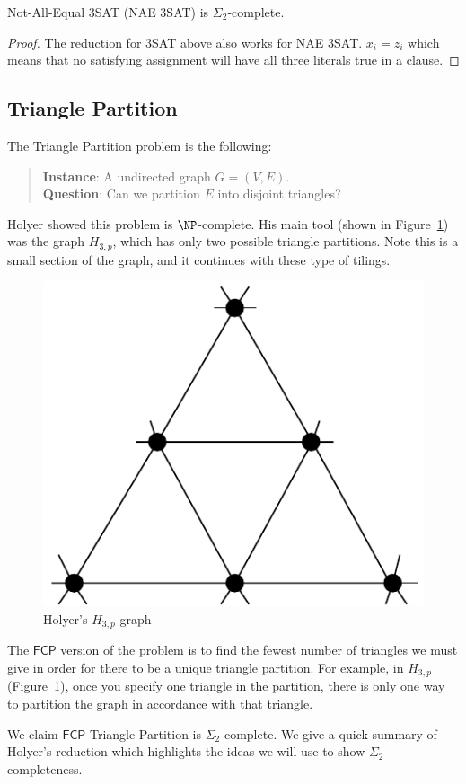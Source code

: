 \documentclass[runningheads,a4paper]{llncs}
\begin{document}
\begin{corollary}
Not-All-Equal 3SAT (NAE 3SAT) is $\Sigma_2$-complete.
\end{corollary}

\begin{proof}
The reduction for 3SAT above also works for NAE 3SAT. $x_i = \overline{z_i}$ which means that no satisfying assignment will have all three literals true in a clause. 
\end{proof}

\subsection{Triangle Partition}

The Triangle Partition problem is the following:
\begin{quote}
\textbf{Instance}: A undirected graph $G = (V, E)$.\\
\textbf{Question}: Can we partition $E$ into disjoint triangles?
\end{quote}

Holyer \cite{holyer1981np} showed this problem is $\NP$-complete. His main tool (shown in Figure~\ref{fig:holyergraph}) was the graph $H_{3, p}$, which has only two possible triangle partitions. Note this is a small section of the graph, and it continues with these type of tilings.
\begin{figure}
\label{fig:holyergraph}
\centering
\includegraphics[width=0.4\linewidth]{Holyergraph.pdf}
\caption{Holyer's $H_{3,p}$ graph}
\end{figure}

The $\mathsf{FCP}$ version of the problem is to find the fewest number of triangles we must give in order for there to be a unique triangle partition. For example, in $H_{3,p}$ (Figure~\ref{fig:holyergraph}), once you specify one triangle in the partition, there is only one way to partition the graph in accordance with that triangle.

We claim $\mathsf{FCP}$ Triangle Partition is $\Sigma_2$-complete. We give a quick summary of Holyer's reduction which highlights the ideas we will use to show $\Sigma_2$ completeness. 
\end{document}
